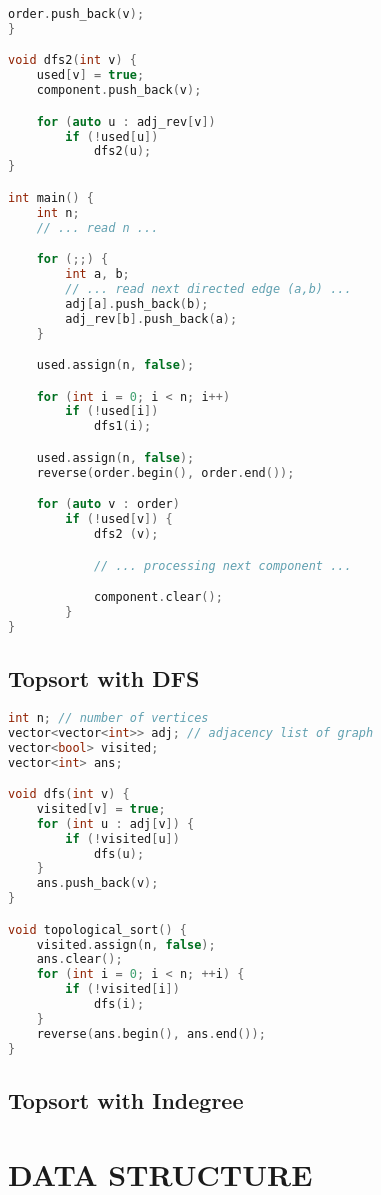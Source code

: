 \documentclass[10pt,a4paper,landscape]{article}
\begin{document}
\begin{multicols}{3}
\begin{lstlisting}[language=C++, breaklines=true]
    order.push_back(v);
}

void dfs2(int v) {
    used[v] = true;
    component.push_back(v);

    for (auto u : adj_rev[v])
        if (!used[u])
            dfs2(u);
}

int main() {
    int n;
    // ... read n ...

    for (;;) {
        int a, b;
        // ... read next directed edge (a,b) ...
        adj[a].push_back(b);
        adj_rev[b].push_back(a);
    }

    used.assign(n, false);

    for (int i = 0; i < n; i++)
        if (!used[i])
            dfs1(i);

    used.assign(n, false);
    reverse(order.begin(), order.end());

    for (auto v : order)
        if (!used[v]) {
            dfs2 (v);

            // ... processing next component ...

            component.clear();
        }
}
\end{lstlisting}

\subsection{Topsort with DFS}
\begin{lstlisting}[language=C++, breaklines=true]
int n; // number of vertices
vector<vector<int>> adj; // adjacency list of graph
vector<bool> visited;
vector<int> ans;

void dfs(int v) {
    visited[v] = true;
    for (int u : adj[v]) {
        if (!visited[u])
            dfs(u);
    }
    ans.push_back(v);
}

void topological_sort() {
    visited.assign(n, false);
    ans.clear();
    for (int i = 0; i < n; ++i) {
        if (!visited[i])
            dfs(i);
    }
    reverse(ans.begin(), ans.end());
}
\end{lstlisting}

\subsection{Topsort with Indegree}

\section{DATA STRUCTURE}


\end{multicols}
\end{document}
